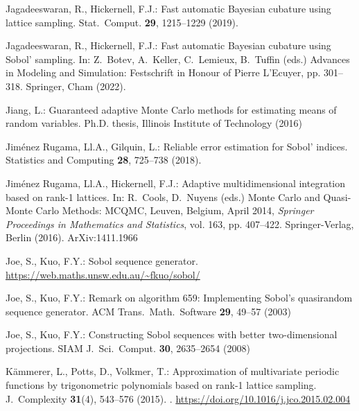 \documentclass[graybox]{svmult}
\begin{document}
\begin{thebibliography}{10}
	Jagadeeswaran, R., Hickernell, F.J.: Fast automatic {B}ayesian cubature
	using lattice sampling.
	\newblock Stat.\ Comput. \textbf{29}, 1215--1229 (2019).
	\newblock {}

	Jagadeeswaran, R., Hickernell, F.J.: Fast automatic {B}ayesian cubature
	using {S}obol' sampling.
	\newblock In: Z.~Botev, A.~Keller, C.~Lemieux, B.~Tuffin (eds.) Advances in
	Modeling and Simulation: {F}estschrift in Honour of {P}ierre {L'E}cuyer, pp.
	301--318. Springer, Cham (2022).
	\newblock {}

	Jiang, L.: Guaranteed adaptive {M}onte {C}arlo methods for estimating means of
	random variables.
	\newblock Ph.D. thesis, Illinois Institute of Technology (2016)

	{Jim\'enez Rugama}, {\relax Ll}.A., Gilquin, L.: Reliable error estimation for
	{S}obol' indices.
	\newblock Statistics and Computing \textbf{28}, 725--738 (2018).
	\newblock {}

	{Jim\'enez Rugama}, {\relax Ll}.A., Hickernell, F.J.: Adaptive
	multidimensional integration based on rank-1 lattices.
	\newblock In: R.~Cools, D.~Nuyens (eds.) {M}onte {C}arlo and Quasi-{M}onte
	{C}arlo Methods: {MCQMC}, {L}euven, {B}elgium, {A}pril 2014, \emph{Springer
		Proceedings in Mathematics and Statistics}, vol. 163, pp. 407--422.
	Springer-Verlag, Berlin (2016).
	\newblock ArXiv:1411.1966

	Joe, S., Kuo, F.Y.: Sobol sequence generator.
	\newblock \urlprefix\url{https://web.maths.unsw.edu.au/~fkuo/sobol/}

	Joe, S., Kuo, F.Y.: Remark on algorithm 659: Implementing {S}obol's quasirandom
	sequence generator.
	\newblock ACM Trans.\ Math.\ Software \textbf{29}, 49--57 (2003)

	Joe, S., Kuo, F.Y.: Constructing {S}obol sequences with better two-dimensional
	projections.
	\newblock SIAM J.\ Sci.\ Comput. \textbf{30}, 2635--2654 (2008)

	K\"{a}mmerer, L., Potts, D., Volkmer, T.: Approximation of multivariate
	periodic functions by trigonometric polynomials based on rank-1 lattice
	sampling.
	\newblock J.\ Complexity \textbf{31}(4), 543--576 (2015).
	\newblock {}.
	\newblock \urlprefix\url{https://doi.org/10.1016/j.jco.2015.02.004}


\end{thebibliography}
\end{document}
